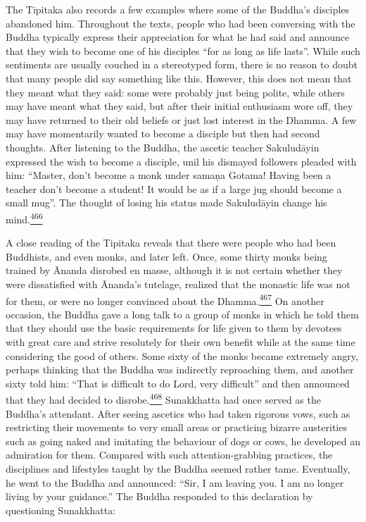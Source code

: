 The Tipitaka also records a few examples where some of the Buddha's
disciples abandoned him. Throughout the texts, people who had been
conversing with the Buddha typically express their appreciation for what
he had said and announce that they wish to become one of his disciples
``for as long as life lasts''. While such sentiments are usually couched
in a stereotyped form, there is no reason to doubt that many people did
say something like this. However, this does not mean that they meant
what they said: some were probably just being polite, while others may
have meant what they said, but after their initial enthusiasm wore off,
they may have returned to their old beliefs or just lost interest in the
Dhamma. A few may have momentarily wanted to become a disciple but then
had second thoughts. After listening to the Buddha, the ascetic teacher
Sakuludāyin expressed the wish to become a disciple, unil his dismayed
followers pleaded with him: ``Master, don't become a monk under samaṇa
Gotama! Having been a teacher don't become a student! It would be as if
a large jug should become a small mug''. The thought of losing his
status made Sakuludāyin change his
mind.\label{footprints_split_013.html_fnref466}\hyperref[footprints_split_025.htmlux5cux23fn466]{\textsuperscript{466}}

A close reading of the Tipitaka reveals that there were people who had
been Buddhists, and even monks, and later left. Once, some thirty monks
being trained by Ānanda disrobed en masse, although it is not certain
whether they were dissatisfied with Ānanda's tutelage, realized that the
monastic life was not for them, or were no longer convinced about the
Dhamma.\label{footprints_split_013.html_fnref467}\hyperref[footprints_split_025.htmlux5cux23fn467]{\textsuperscript{467}}
On another occasion, the Buddha gave a long talk to a group of monks in
which he told them that they should use the basic requirements for life
given to them by devotees with great care and strive resolutely for
their own benefit while at the same time considering the good of others.
Some sixty of the monks became extremely angry, perhaps thinking that
the Buddha was indirectly reproaching them, and another sixty told him:
``That is difficult to do Lord, very difficult'' and then announced that
they had decided to
disrobe.\label{footprints_split_013.html_fnref468}\hyperref[footprints_split_025.htmlux5cux23fn468]{\textsuperscript{468}}
Sunakkhatta had once served as the Buddha's attendant. After seeing
ascetics who had taken rigorous vows, such as restricting their
movements to very small areas or practicing bizarre austerities such as
going naked and imitating the behaviour of dogs or cows, he developed an
admiration for them. Compared with such attention-grabbing practices,
the disciplines and lifestyles taught by the Buddha seemed rather tame.
Eventually, he went to the Buddha and announced: ``Sir, I am leaving
you. I am no longer living by your guidance.'' The Buddha responded to
this declaration by questioning Sunakkhatta:

